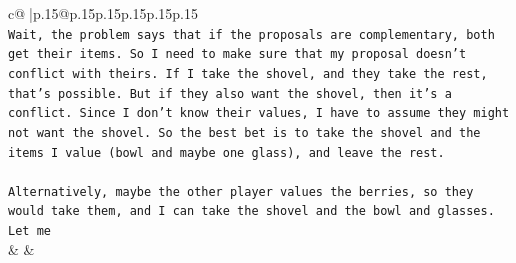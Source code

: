 \documentclass{article}
\begin{document}
{\begin{supertabular}{c@{$\;$}|p{.15\linewidth}@{}p{.15\linewidth}p{.15\linewidth}p{.15\linewidth}p{.15\linewidth}p{.15\linewidth}}
{{{\\ 
\texttt{Wait, the problem says that if the proposals are complementary, both get their items. So I need to make sure that my proposal doesn't conflict with theirs. If I take the shovel, and they take the rest, that's possible. But if they also want the shovel, then it's a conflict. Since I don't know their values, I have to assume they might not want the shovel. So the best bet is to take the shovel and the items I value (bowl and maybe one glass), and leave the rest. } \\
\\ 
\texttt{Alternatively, maybe the other player values the berries, so they would take them, and I can take the shovel and the bowl and glasses. Let me} \\
            }
        }
    }
    & & \\ \\


\end{supertabular}}
\end{document}
